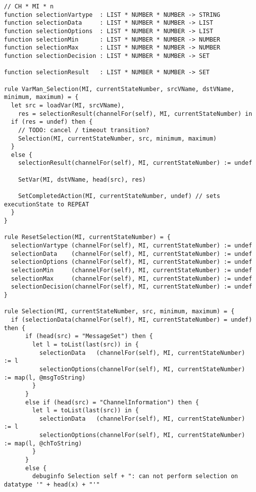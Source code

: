 \begin{listing}[H]
\begin{verbatim}
// CH * MI * n
function selectionVartype  : LIST * NUMBER * NUMBER -> STRING
function selectionData     : LIST * NUMBER * NUMBER -> LIST
function selectionOptions  : LIST * NUMBER * NUMBER -> LIST
function selectionMin      : LIST * NUMBER * NUMBER -> NUMBER
function selectionMax      : LIST * NUMBER * NUMBER -> NUMBER
function selectionDecision : LIST * NUMBER * NUMBER -> SET

function selectionResult   : LIST * NUMBER * NUMBER -> SET

rule VarMan_Selection(MI, currentStateNumber, srcVName, dstVName, minimum, maximum) = {
  let src = loadVar(MI, srcVName),
    res = selectionResult(channelFor(self), MI, currentStateNumber) in
  if (res = undef) then {
    // TODO: cancel / timeout transition?
    Selection(MI, currentStateNumber, src, minimum, maximum)
  }
  else {
    selectionResult(channelFor(self), MI, currentStateNumber) := undef

    SetVar(MI, dstVName, head(src), res)

    SetCompletedAction(MI, currentStateNumber, undef) // sets executionState to REPEAT
  }
}

rule ResetSelection(MI, currentStateNumber) = {
  selectionVartype (channelFor(self), MI, currentStateNumber) := undef
  selectionData    (channelFor(self), MI, currentStateNumber) := undef
  selectionOptions (channelFor(self), MI, currentStateNumber) := undef
  selectionMin     (channelFor(self), MI, currentStateNumber) := undef
  selectionMax     (channelFor(self), MI, currentStateNumber) := undef
  selectionDecision(channelFor(self), MI, currentStateNumber) := undef
}

rule Selection(MI, currentStateNumber, src, minimum, maximum) = {
  if (selectionData(channelFor(self), MI, currentStateNumber) = undef) then {
      if (head(src) = "MessageSet") then {
        let l = toList(last(src)) in {
          selectionData   (channelFor(self), MI, currentStateNumber) := l
          selectionOptions(channelFor(self), MI, currentStateNumber) := map(l, @msgToString)
        }
      }
      else if (head(src) = "ChannelInformation") then {
        let l = toList(last(src)) in {
          selectionData   (channelFor(self), MI, currentStateNumber) := l
          selectionOptions(channelFor(self), MI, currentStateNumber) := map(l, @chToString)
        }
      }
      else {
        debuginfo Selection self + ": can not perform selection on datatype '" + head(x) + "'"


\end{verbatim}
\end{listing}
